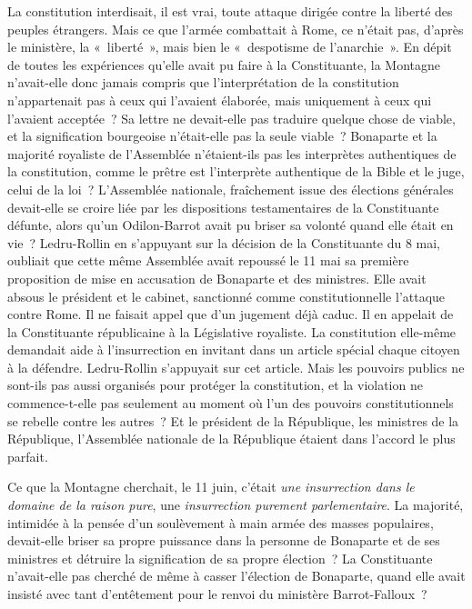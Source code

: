\documentclass[french,twoside]{book} %
\begin{document}
La constitution interdisait, il est vrai, toute attaque dirigée contre la liberté des peuples étrangers. Mais ce que l’armée combattait à Rome, ce n’était pas, d’après le ministère, la « liberté », mais bien le « despotisme de l’anarchie ». En dépit de toutes les expériences qu’elle avait pu faire à la Constituante, la Montagne n’avait-elle donc jamais compris que l’interprétation de la constitution n’appartenait pas à ceux qui l’avaient élaborée, mais uniquement à ceux qui l’avaient acceptée ? Sa lettre ne devait-elle pas traduire quelque chose de viable, et la signification bourgeoise n’était-elle pas la seule viable ? Bonaparte et la majorité royaliste de l’Assemblée n’étaient-ils pas les interprètes authentiques de la constitution, comme le prêtre est l’interprète authentique de la Bible et le juge, celui de la loi ? L’Assemblée nationale, fraîchement issue des élections générales devait-elle se croire liée par les dispositions testamentaires de la Constituante défunte, alors qu’un Odilon-Barrot avait pu briser sa volonté quand elle était en vie ? Ledru-Rollin en s’appuyant sur la décision de la Constituante du 8 mai, oubliait que cette même Assemblée avait repoussé le 11 mai sa première proposition de mise en accusation de Bonaparte et des ministres. Elle avait absous le président et le cabinet, sanctionné comme constitutionnelle l’attaque contre Rome. Il ne faisait appel que d’un jugement déjà caduc. Il en appelait de la Constituante républicaine à la Législative royaliste. La constitution elle-même demandait aide à l’insurrection en invitant dans un article spécial chaque citoyen à la défendre. Ledru-Rollin s’appuyait sur cet article. Mais les pouvoirs publics ne sont-ils pas aussi organisés pour protéger la constitution, et la violation ne commence-t-elle pas seulement au moment où l’un des pouvoirs constitutionnels se rebelle contre les autres ? Et le président de la République, les ministres de la République, l’Assemblée nationale de la République étaient dans l’accord le plus parfait.\par
Ce que la Montagne cherchait, le 11 juin, c’était \emph{une insurrection dans le domaine de la raison pure}, une \emph{insurrection purement parlementaire}. La majorité, intimidée à la pensée d’un soulèvement à main armée des masses populaires, devait-elle briser sa propre puissance dans la personne de Bonaparte et de ses ministres et détruire la signification de sa propre élection ? La Constituante n’avait-elle pas cherché de même à casser l’élection de Bonaparte, quand elle avait insisté avec tant d’entêtement pour le renvoi du ministère Barrot-Falloux ?\par
\end{document}
